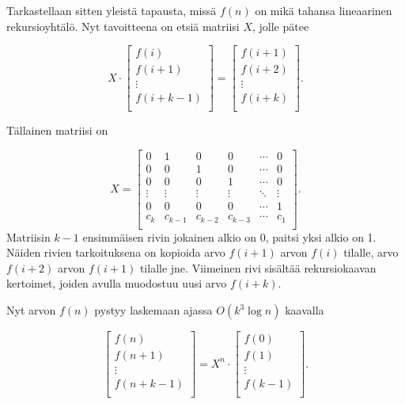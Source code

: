Tarkastellaan sitten yleistä tapausta,
missä $f(n)$ on mikä tahansa lineaarinen
rekursioyhtälö. Nyt tavoitteena on etsiä
matriisi $X$, jolle pätee

\[ X \cdot
 \begin{bmatrix}
  f(i) \\
  f(i+1) \\
  \vdots \\
  f(i+k-1) \\
 \end{bmatrix}
=
 \begin{bmatrix}
  f(i+1) \\
  f(i+2) \\
  \vdots \\
  f(i+k) \\
 \end{bmatrix}.
\]

Tällainen matriisi on

\[
X =
 \begin{bmatrix}
  0 & 1 & 0 & 0 & \cdots & 0 \\
  0 & 0 & 1 & 0 & \cdots & 0 \\
  0 & 0 & 0 & 1 & \cdots & 0 \\
  \vdots & \vdots & \vdots & \vdots & \ddots & \vdots \\
  0 & 0 & 0 & 0 & \cdots & 1 \\
  c_k & c_{k-1} & c_{k-2} & c_{k-3} & \cdots & c_1 \\
 \end{bmatrix}.
\]
Matriisin $k-1$ ensimmäisen rivin jokainen alkio on 0,
paitsi yksi alkio on 1.
Näiden rivien tarkoituksena on kopioida
arvo $f(i+1)$ arvon $f(i)$ tilalle,
arvo $f(i+2)$ arvon $f(i+1)$ tilalle jne.
Viimeinen rivi sisältää rekursiokaavan kertoimet,
joiden avulla muodostuu uusi arvo $f(i+k)$.

Nyt arvon $f(n)$ pystyy laskemaan ajassa $O(k^3 \log n)$
kaavalla

\[
 \begin{bmatrix}
  f(n) \\
  f(n+1) \\
  \vdots \\
  f(n+k-1) \\
 \end{bmatrix}
=
X^n \cdot
 \begin{bmatrix}
  f(0) \\
  f(1) \\
  \vdots \\
  f(k-1) \\
 \end{bmatrix}.
\]


